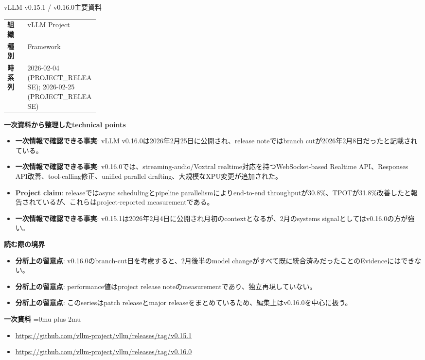 \begin{technicalnote}{vLLM v0.15.1 / v0.16.0}{主要資料}
\begingroup
\begin{tabularx}{\linewidth}{@{}>{\bfseries}p{0.22\linewidth}X@{}}
組織 & vLLM Project \\
種別 & Framework \\
時系列 & 2026-02-04 (PROJECT\_RELEASE); 2026-02-25 (PROJECT\_RELEASE) \\
\end{tabularx}
\smallskip
{\bfseries 一次資料から整理したtechnical points}
\begin{itemize}[leftmargin=1.5em,itemsep=0.35em]
\item \textbf{一次情報で確認できる事実}: vLLM v0.16.0は2026年2月25日に公開され、release noteではbranch cutが2026年2月8日だったと記載されている。
\item \textbf{一次情報で確認できる事実}: v0.16.0では、streaming-audio/Voxtral realtime対応を持つWebSocket-based Realtime API、Responses API改善、tool-calling修正、unified parallel drafting、大規模なXPU変更が追加された。
\item \textbf{Project claim}: releaseではasync schedulingとpipeline parallelismによりend-to-end throughputが30.8\%、TPOTが31.8\%改善したと報告されているが、これらはproject-reported measurementである。
\item \textbf{一次情報で確認できる事実}: v0.15.1は2026年2月4日に公開され月初のcontextとなるが、2月のsystems signalとしてはv0.16.0の方が強い。
\end{itemize}
\begin{minipage}{\linewidth}
{\bfseries 読む際の境界}
\begin{itemize}[leftmargin=1.5em,itemsep=0.35em]
\item \textbf{分析上の留意点}: v0.16.0のbranch-cut日を考慮すると、2月後半のmodel changeがすべて既に統合済みだったことのEvidenceにはできない。
\item \textbf{分析上の留意点}: performance値はproject release noteのmeasurementであり、独立再現していない。
\item \textbf{分析上の留意点}: このseriesはpatch releaseとmajor releaseをまとめているため、編集上はv0.16.0を中心に扱う。
\end{itemize}
\begin{samepage}
{\bfseries 一次資料}
\begingroup\sloppy
\Urlmuskip=0mu plus 2mu\relax
\begin{itemize}[leftmargin=1.5em,itemsep=0.25em]
\item {\scriptsize\url{https://github.com/vllm-project/vllm/releases/tag/v0.15.1}}
\item {\scriptsize\url{https://github.com/vllm-project/vllm/releases/tag/v0.16.0}}
\end{itemize}
\endgroup
\end{samepage}
\end{minipage}
\endgroup
\end{technicalnote}
\medskip

